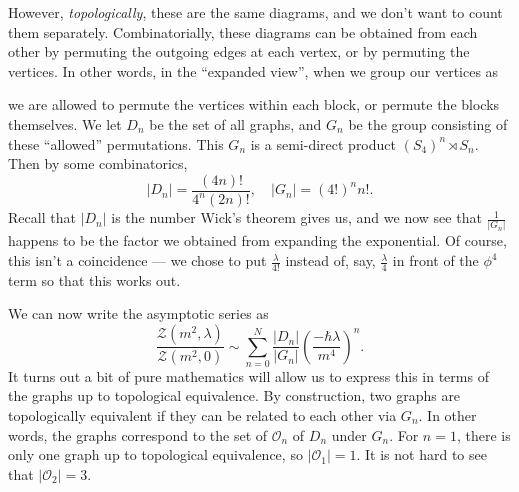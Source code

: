 \documentclass[a4paper]{article}
\begin{document}
However, \emph{topologically}, these are the same diagrams, and we don't want to count them separately. Combinatorially, these diagrams can be obtained from each other by permuting the outgoing edges at each vertex, or by permuting the vertices. In other words, in the ``expanded view'', when we group our vertices as
\begin{center}
\end{center}
we are allowed to permute the vertices within each block, or permute the blocks themselves. We let $D_n$ be the set of all graphs, and $G_n$ be the group consisting of these ``allowed'' permutations. This $G_n$ is a semi-direct product $(S_4)^n \rtimes S_n$. Then by some combinatorics,
\[
  |D_n| = \frac{(4n)!}{4^n(2n)!},\quad |G_n| = (4!)^n n!.
\]
Recall that $|D_n|$ is the number Wick's theorem gives us, and we now see that $\frac{1}{|G_n|}$ happens to be the factor we obtained from expanding the exponential. Of course, this isn't a coincidence --- we chose to put $\frac{\lambda}{4!}$ instead of, say, $\frac{\lambda}{4}$ in front of the $\phi^4$ term so that this works out.

We can now write the asymptotic series as
\[
  \frac{\mathcal{Z}(m^2, \lambda)}{\mathcal{Z}(m^2, 0)} \sim \sum_{n = 0}^N \frac{|D_n|}{|G_n|} \left(\frac{-\hbar \lambda}{m^4}\right)^n.
\]
It turns out a bit of pure mathematics will allow us to express this in terms of the graphs up to topological equivalence. By construction, two graphs are topologically equivalent if they can be related to each other via $G_n$. In other words, the graphs correspond to the set of  $\mathcal{O}_n$ of $D_n$ under $G_n$. For $n = 1$, there is only one graph up to topological equivalence, so $|\mathcal{O}_1| = 1$. It is not hard to see that $|\mathcal{O}_2| = 3$.
\end{document}
